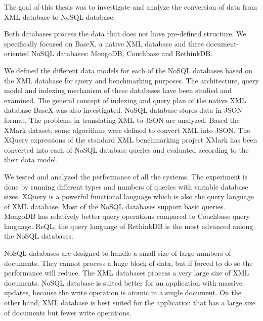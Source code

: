 The goal of this thesis was to investigate and analyze the conversion of data from XML database to NoSQL database.

Both databases  process the data that does not have pre-defined structure. We specifically focused on BaseX, a native XML database and three document-oriented NoSQL databases: MongoDB, Couchbase and RethinkDB. 

We defined the different data models for each of the NoSQL databases based on the XML database for query and benchmarking purposes. The architecture, query model and indexing mechanism of these databases have been studied and examined. The general concept of indexing and query plan of the native XML database BaseX was also investigated. NoSQL database stores data in JSON format. The problems in translating XML to JSON are analyzed. Based the XMark dataset, some algorithms were defined to convert XML into JSON.
The XQuery expressions of the standard XML benchmarking project XMark has been converted into each of NoSQL database queries and evaluated according to the their data model.
\par
We tested and analyzed the performance of all the systems. The experiment is done by running different types and numbers of queries with variable database sizes. 
XQuery is a powerful functional language which is also the query language of XML database. Most of the NoSQL databases support basic queries. MongoDB has relatively better query operations compared to Couchbase query language. ReQL, the query language of RethinkDB is the most advanced among the NoSQL databases. 

\par
NoSQL databases are designed to handle a small size of large numbers of documents. They cannot process a huge block of data, but if forced to do so the performance will reduce. The XML databases process a very large size of XML documents. NoSQL database is suited better for an application with massive updates,  because the write operation is atomic in a single document. On the other hand, XML database is best suited for the application that has a large size of documents but fewer write operations.






